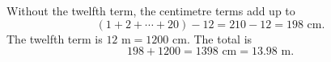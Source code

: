 Without the twelfth term, the centimetre terms add up to
\[
(1+2+\cdots+20)-12=210-12=198\text{ cm}.
\]
The twelfth term is $12\text{ m}=1200$ cm. The total is
\[
198+1200=\boxed{1398\text{ cm}=13.98\text{ m}}.
\]
